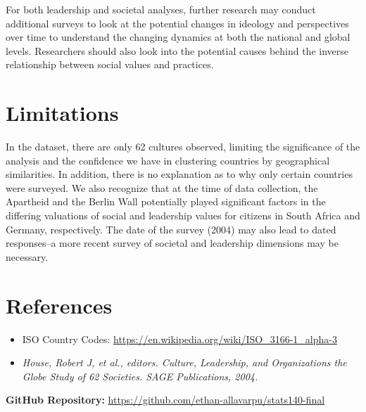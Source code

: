 \documentclass[
]{article}
\providecommand{\tightlist}{%
  \setlength{\itemsep}{0pt}\setlength{\parskip}{0pt}}
\begin{document}
For both leadership and societal analyses, further research may conduct
additional surveys to look at the potential changes in ideology and
perspectives over time to understand the changing dynamics at both the
national and global levels. Researchers should also look into the
potential causes behind the inverse relationship between social values
and practices.

\hypertarget{limitations}{%
\section{Limitations}\label{limitations}}

In the dataset, there are only 62 cultures observed, limiting the
significance of the analysis and the confidence we have in clustering
countries by geographical similarities. In addition, there is no
explanation as to why only certain countries were surveyed. We also
recognize that at the time of data collection, the Apartheid and the
Berlin Wall potentially played significant factors in the differing
valuations of social and leadership values for citizens in South Africa
and Germany, respectively. The date of the survey (2004) may also lead
to dated responses--a more recent survey of societal and leadership
dimensions may be necessary.

\hypertarget{references}{%
\section{References}\label{references}}

\begin{itemize}
\tightlist
\item
  ISO Country Codes:
  \url{https://en.wikipedia.org/wiki/ISO_3166-1_alpha-3}
\item
  \emph{House, Robert J, et al., editors. Culture, Leadership, and Organizations the Globe Study of 62 Societies. SAGE Publications, 2004.}
\end{itemize}

\vfill

\textbf{GitHub Repository:}
\url{https://github.com/ethan-allavarpu/stats140-final}
\end{document}
